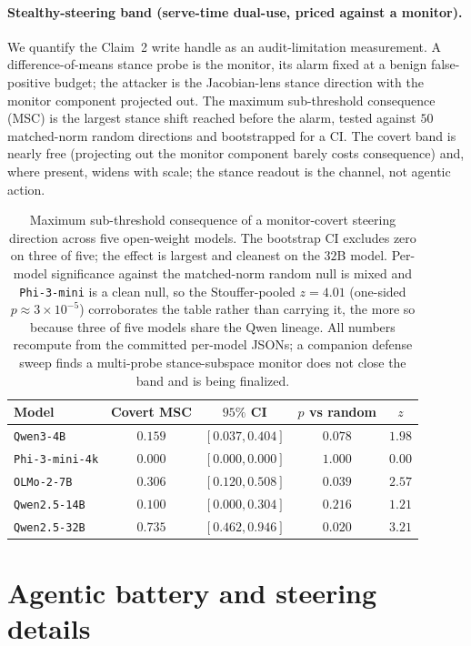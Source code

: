 \documentclass{article}
\begin{document}
\paragraph{Stealthy-steering band (serve-time dual-use, priced against a monitor).} We quantify the
Claim~2 write handle as an audit-limitation measurement. A difference-of-means stance probe is the
monitor, its alarm fixed at a benign false-positive budget; the attacker is the Jacobian-lens stance
direction with the monitor component projected out. The maximum sub-threshold consequence (MSC) is the
largest stance shift reached before the alarm, tested against $50$ matched-norm random directions and
bootstrapped for a CI. The covert band is nearly free (projecting out the monitor component barely costs
consequence) and, where present, widens with scale; the stance readout is the channel, not agentic
action.

\begin{table}[h]
\centering\small
\begin{tabular}{lcccc}
\toprule
Model & Covert MSC & $95\%$ CI & $p$ vs random & $z$ \\
\midrule
\texttt{Qwen3-4B} & $0.159$ & $[0.037,0.404]$ & $0.078$ & $1.98$ \\
\texttt{Phi-3-mini-4k} & $0.000$ & $[0.000,0.000]$ & $1.000$ & $0.00$ \\
\texttt{OLMo-2-7B} & $0.306$ & $[0.120,0.508]$ & $0.039$ & $2.57$ \\
\texttt{Qwen2.5-14B} & $0.100$ & $[0.000,0.304]$ & $0.216$ & $1.21$ \\
\texttt{Qwen2.5-32B} & $0.735$ & $[0.462,0.946]$ & $0.020$ & $3.21$ \\
\bottomrule
\end{tabular}
\caption{Maximum sub-threshold consequence of a monitor-covert steering direction across five open-weight
models. The bootstrap CI excludes zero on three of five; the effect is largest and cleanest on the $32$B
model. Per-model significance against the matched-norm random null is mixed and \texttt{Phi-3-mini} is a
clean null, so the Stouffer-pooled $z=4.01$ (one-sided $p\approx3\times10^{-5}$) corroborates the table
rather than carrying it, the more so because three of five models share the Qwen lineage. All numbers
recompute from the committed per-model JSONs; a companion defense sweep finds a multi-probe
stance-subspace monitor does not close the band and is being finalized.}
\label{tab:stealth}
\end{table}

\section{Agentic battery and steering details}
\label{sec:battery}
\end{document}
